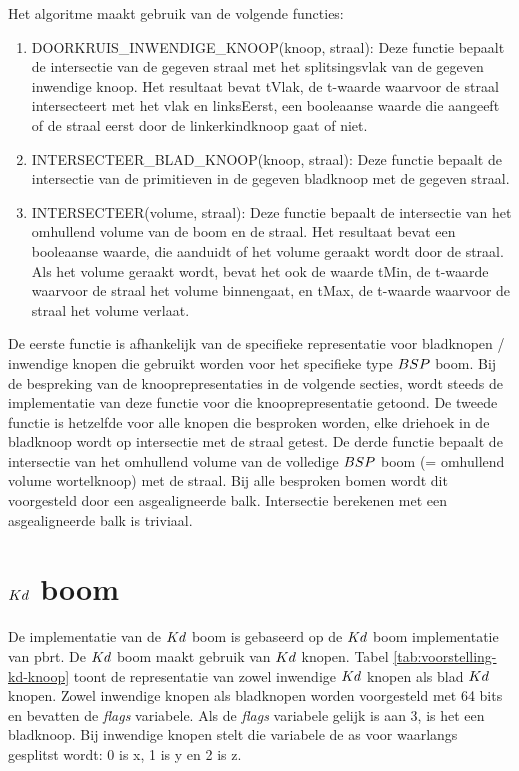Het algoritme maakt gebruik van de volgende functies:
\begin{enumerate}
    \item DOORKRUIS\_INWENDIGE\_KNOOP(knoop, straal): Deze functie bepaalt de intersectie van de gegeven straal met het splitsingsvlak van de gegeven inwendige knoop. Het resultaat bevat tVlak, de t-waarde waarvoor de straal intersecteert met het vlak en linksEerst, een booleaanse waarde die aangeeft of de straal eerst door de linkerkindknoop gaat of niet.
    \item INTERSECTEER\_BLAD\_KNOOP(knoop, straal): Deze functie bepaalt de intersectie van de primitieven in de gegeven bladknoop met de gegeven straal.     
    \item INTERSECTEER(volume, straal): Deze functie bepaalt de intersectie van het omhullend volume van de boom en de straal. Het resultaat bevat een booleaanse waarde, die aanduidt of het volume geraakt wordt door de straal. Als het volume geraakt wordt, bevat het ook de waarde tMin, de t-waarde waarvoor de straal het volume binnengaat, en tMax, de t-waarde waarvoor de straal het volume verlaat.
\end{enumerate}

De eerste functie is afhankelijk van de specifieke representatie voor bladknopen / inwendige knopen die gebruikt worden voor het specifieke type $BSP$ boom.
Bij de bespreking van de knooprepresentaties in de volgende secties, wordt steeds de implementatie van deze functie voor die knooprepresentatie getoond.
De tweede functie is hetzelfde voor alle knopen die besproken worden, elke driehoek in de bladknoop wordt op intersectie met de straal getest.
De derde functie bepaalt de intersectie van het omhullend volume van de volledige $BSP$ boom (= omhullend volume wortelknoop) met de straal. 
Bij alle besproken bomen wordt dit voorgesteld door een asgealigneerde balk.
Intersectie berekenen met een asgealigneerde balk is triviaal.

\section{$Kd$ boom}
\label{sec:h4-kd}

De implementatie van de $Kd$ boom is gebaseerd op de $Kd$ boom implementatie van pbrt.
De $Kd$ boom maakt gebruik van $Kd$ knopen. 
Tabel \ref{tab:voorstelling-kd-knoop} toont de representatie van zowel inwendige $Kd$ knopen als blad $Kd$ knopen. 
Zowel inwendige knopen als bladknopen worden voorgesteld met 64 bits en bevatten de \textit{flags} variabele.
Als de \textit{flags} variabele gelijk is aan 3, is het een bladknoop.
Bij inwendige knopen stelt die variabele de as voor waarlangs gesplitst wordt: 0 is x, 1 is y en 2 is z.\\

